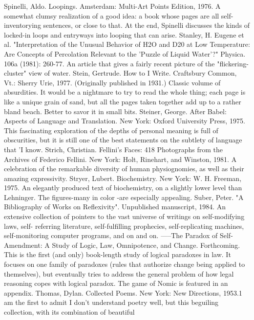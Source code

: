 Spinelli, Aldo. Loopings. Amsterdam: Multi-Art Points Edition, 1976. A somewhat clumsy
  realization of a good idea: a book whose pages are all self-inventorying sentences, or close
  to that. At the end, Spinelli discusses the kinds of locked-in loops and entryways into
  looping that can arise.
Stanley, H. Eugene et al. "Interpretation of the Unusual Behavior of H2O and D20 at Low
  Temperature: Are Concepts of Percolation Relevant to the 'Puzzle of Liquid Water'?"
  Physica. 106a (1981): 260-77. An article that gives a fairly recent picture of the "flickering-
  cluster" view of water.
Stein, Gertrude. How to I Write. Craftsbury Common, Vt.: Sherry Urie, 1977. (Originally
  published in 1931.) Classic volume of absurdities. It would be a nightmare to try to read the
  whole thing; each page is like a unique grain of sand, but all the pages taken together add up
  to a rather bland beach. Better to savor it in small bits.
Steiner, George. After Babel: Aspects of Language and Translation. New York: Oxford
  University Press, 1975. This fascinating exploration of the depths of personal meaning is
  full of obscurities, but it is still one of the best statements on the subtlety of language that 'I
  know.
Strich, Christian. Fellini's Faces: 418 Photographs from the Archives of Federico Fellini. New
  York: Holt, Rinehart, and Winston, 1981. A celebration of the remarkable diversity of
  human physiognomies, as well as their amazing expressivity.
Stryer, Lubert. Biochemistry. New York: W. H. Freeman, 1975. An elegantly produced text
  of biochemistry, on a slightly lower level than Lehninger. The figures-many in color -are
  especially appealing.
Suber, Peter. "A Bibliography of Works on Reflexivity". Unpublished manuscript, 1984. An
  extensive collection of pointers to the vast universe of writings on self-modifying laws, self-
  referring literature, self-fulfilling prophecies, self-replicating machines, self-monitoring
  computer programs, and on and on.
-----The Paradox of Self-Amendment: A Study of Logic, Law, Omnipotence, and Change.
  Forthcoming. This is the first (and only) book-length study of logical paradoxes in law. It
  focuses on one family of paradoxes (rules that authorize change being applied to
  themselves), but eventually tries to address the general problem of how legal reasoning
  copes with logical paradox. The game of Nomic is featured in an appendix.
Thomas, Dylan. Collected Poems. New York: New Directions, 1953.1 am the first to admit I
  don't understand poetry well, but this beguiling collection, with its combination of beautiful
